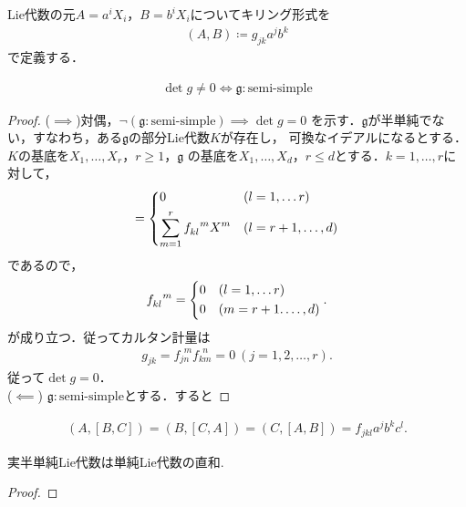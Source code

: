 \begin{defn}
	Lie代数の元\(A=a^{i}X_{i}\)，\(B=b^{i}X_{i}\)についてキリング形式を
	\begin{align}
		(A,B)\coloneqq{}g_{jk}a^{j}b^{k}
	\end{align}
	で定義する．
\end{defn}
\begin{fact}
	\begin{align}
		\det{}g\neq{}0\iff{}\mathfrak{g}:\mbox{semi-simple}
	\end{align}
\end{fact}
\begin{proof}
	(\(\implies\))対偶，\(\neg(\mathfrak{g}:\mbox{semi-simple})\implies{}\det{}g=0\)
	を示す．\(\mathfrak{g}\)が半単純でない，すなわち，ある\(\mathfrak{g}\)の部分Lie代数\(K\)が存在し，
	可換なイデアルになるとする．\(K\)の基底を\(X_{1},\ldots,X_{r}\)，\(r\geq{}1\)，\(\mathfrak{g}\)
	の基底を\(X_{1},\ldots,X_{d}\)，\(r\leq{}d\)とする．\(k=1,\ldots,r\)に対して，
	\begin{align}
		[X_{k},X_{l}]=
		\begin{dcases}
			0                                 & (l=1,\ldots{}r)    \\
			\sum_{m=1}^{r}f_{kl}^{\ \ m}X^{m} & (l=r+1,\ldots{},d)
		\end{dcases}
	\end{align}
	であるので，
	\begin{align}
		f_{kl}^{\ \ m}=
		\begin{dcases}
			0 & (l=1,\ldots{}r)    \\
			0 & (m=r+1.\ldots{},d)
		\end{dcases}.
	\end{align}
	が成り立つ．従ってカルタン計量は
	\begin{align}
		g_{jk}=f_{jn}^{\ \ m}f_{km}^{\ \ n}=0 \ (j=1,2,\ldots,r).
	\end{align}
	従って\(\det{}g=0\)．\\
	(\(\impliedby\)) \(\mathfrak{g}:\text{semi-simple}\)とする．すると
\end{proof}
\begin{cor}
	\begin{align}
		(A,[B,C])=(B,[C,A])=(C,[A,B])=f_{jkl}a^{j}b^{k}c^{l}.
	\end{align}
\end{cor}
\begin{fact}[Cartan分解]
	実半単純Lie代数は単純Lie代数の直和.
\end{fact}
\begin{proof}

\end{proof}
